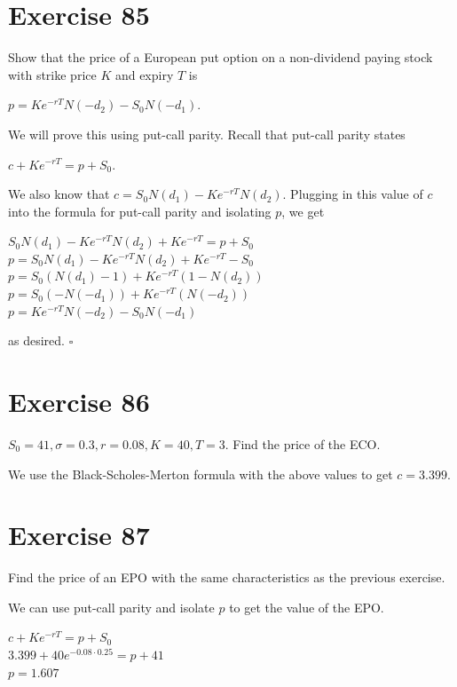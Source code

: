 \documentclass{article}
\begin{document}
\section*{Exercise 85}
\begin{flushleft}
    Show that the price of a European put option on a non-dividend paying stock with strike price $K$ and expiry $T$ is 
    \begin{center}
        $p=Ke^{-rT}N(-d_2)-S_0N(-d_1)$.
    \end{center}
 We will prove this using put-call parity. Recall that put-call parity states
\begin{center}
    $c + Ke^{-rT} = p + S_0$.
\end{center}
We also know that $c = S_0N(d_1) - Ke^{-rT}N(d_2)$. Plugging in this value of $c$ into the formula for put-call parity and isolating $p$, we get
\begin{center}
    $S_0N(d_1) - Ke^{-rT}N(d_2) + Ke^{-rT} = p + S_0$ \\
    $p = S_0N(d_1) - Ke^{-rT}N(d_2)+Ke^{-rT} - S_0$ \\
    $p = S_0 (N(d_1) - 1) + Ke^{-rT}(1-N(d_2))$ \\
    $p = S_0(-N(-d_1)) + Ke^{-rT}(N(-d_2))$ \\
    $p = Ke^{-rT}N(-d_2) - S_0N(-d_1)$
\end{center}
as desired. $\square$
\end{flushleft}

\section*{Exercise 86}
$S_0 = 41, \sigma = 0.3, r = 0.08, K=40, T=3$. Find the price of the ECO.
\begin{flushleft}
    We use the Black-Scholes-Merton formula with the above values to get $c = 3.399$.
\end{flushleft}

\section*{Exercise 87}
Find the price of an EPO with the same characteristics as the previous exercise.
\begin{flushleft}
    We can use put-call parity and isolate $p$ to get the value of the EPO.
    \begin{center}
        $c + Ke^{-rT} = p + S_0$ \\
        $3.399 + 40e^{-0.08 \cdot 0.25} = p + 41$ \\
        $p = 1.607$
    \end{center}
\end{flushleft}
\end{document}
